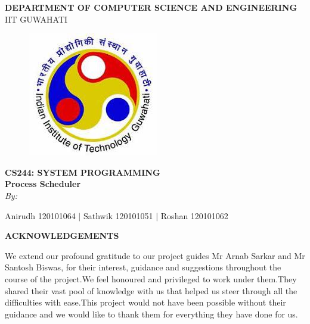 \documentclass[a4paper,12pt]{article}
\begin{document}
\begin{center}
\vspace{1cm}
\LARGE{\textbf{DEPARTMENT OF COMPUTER SCIENCE AND ENGINEERING}}\\
\vspace{1cm}
\Large{IIT GUWAHATI}\\

\vspace{5 mm}
\begin{figure}[h]
\centering
\includegraphics[scale=1]{iitglogo.jpg}
\end{figure}
\vspace{5 mm}
\textbf{CS244: SYSTEM PROGRAMMING}\\
\vspace{2.5cm}
\textbf{Process Scheduler}\\


\vspace{1.5cm}
\normalsize{\textit{By:}}

\vspace{5mm}
\large

Anirudh 120101064 $\vert$ Sathwik 120101051 $\vert$ Roshan 120101062 \\



\end{center}
\vspace{15mm}
\clearpage
\begin{LARGE}
\begin{center}
\textbf{ACKNOWLEDGEMENTS}

\end{center}
\end{LARGE}
\vspace{5mm}
We extend our profound gratitude to our project guides Mr Arnab Sarkar and Mr Santosh Biswas, for their interest, guidance and suggestions throughout the course of the project.We feel honoured and privileged to work under them.They shared their vast pool of knowledge with us that helped us steer through all the difficulties with ease.This project would not have been possible without their guidance and we would like to thank them for everything they have done for us.
\clearpage
\tableofcontents
\clearpage
\end{document}
